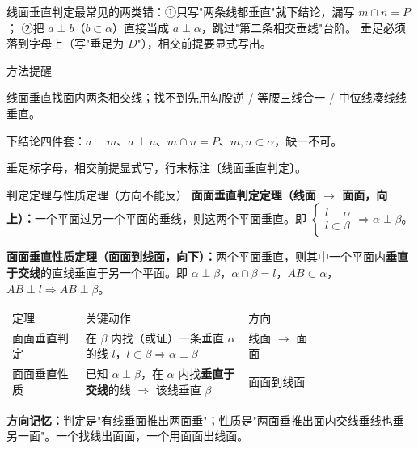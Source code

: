 \documentclass{exam-zh}
\begin{document}
\begin{eduMistakeBox}
线面垂直判定最常见的两类错：①只写"两条线都垂直"就下结论，漏写 $m\cap n=P$；
②把 $a\perp b$（$b\subset\alpha$）直接当成 $a\perp\alpha$，跳过"第二条相交垂线"台阶。
垂足必须落到字母上（写"垂足为 $D$"），相交前提要显式写出。
\end{eduMistakeBox}




\begin{eduSummaryBlock}{\eduIconPin}{方法提醒}
\begin{eduBulletList}
  \item 线面垂直找面内两条相交线；找不到先用勾股逆 / 等腰三线合一 / 中位线凑线线垂直。  \item 下结论四件套：$a\perp m$、$a\perp n$、$m\cap n=P$、$m,n\subset\alpha$，缺一不可。  \item 垂足标字母，相交前提显式写，行末标注〔线面垂直判定〕。\end{eduBulletList}
\end{eduSummaryBlock}



\clearpage
{}


\begin{eduSolutionBox}{判定定理与性质定理（方向不能反）}
  \begingroup
  \setlength{\parskip}{2.5mm}
\textbf{面面垂直判定定理（线面 $\to$ 面面，向上）：}一个平面过另一个平面的垂线，则这两个平面垂直。即 $\begin{cases} l\perp\alpha \\ l\subset\beta \end{cases}\Rightarrow\alpha\perp\beta$。\par
\textbf{面面垂直性质定理（面面到线面，向下）：}两个平面垂直，则其中一个平面内\textbf{垂直于交线}的直线垂直于另一个平面。即 $\alpha\perp\beta$，$\alpha\cap\beta=l$，$AB\subset\alpha$，$AB\perp l\Rightarrow AB\perp\beta$。\par
\begin{tabular}{p{0.18\linewidth}p{0.40\linewidth}p{0.18\linewidth}}
定理 & 关键动作 & 方向\\
面面垂直判定 & 在 $\beta$ 内找（或证）一条垂直 $\alpha$ 的线 $l$，$l\subset\beta\Rightarrow\alpha\perp\beta$ & 线面 $\to$ 面面\\
面面垂直性质 & 已知 $\alpha\perp\beta$，在 $\alpha$ 内找\textbf{垂直于交线}的线 $\Rightarrow$ 该线垂直 $\beta$ & 面面到线面
\end{tabular}
\par
\textbf{方向记忆：}判定是"有线垂面推出两面垂"；性质是"两面垂推出面内交线垂线也垂另一面"。一个找线出面面，一个用面面出线面。\par
  \endgroup
\end{eduSolutionBox}
\end{document}
